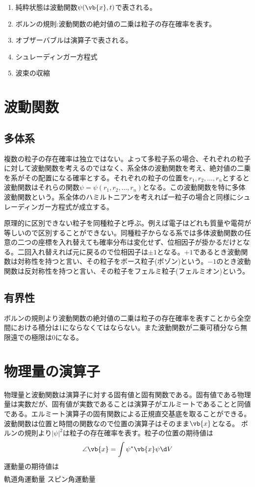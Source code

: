 	\begin{enumerate}
		\item 純粋状態は波動関数$\psi(\vb{x}, t)$で表される。
		\item ボルンの規則:波動関数の絶対値の二乗は粒子の存在確率を表す。
		\item オブザーバブルは演算子で表される。
		\item シュレーディンガー方程式
		\item 波束の収縮
	\end{enumerate}
\section{波動関数}
	\subsection{多体系}
		複数の粒子の存在確率は独立ではない。よって多粒子系の場合、それぞれの粒子に対して波動関数を考えるのではなく、系全体の波動関数を考え、絶対値の二乗を系がその配置になる確率とする。それぞれの粒子の位置を$r_1, r_2, \ldots, r_n$とすると波動関数はそれらの関数$\psi = \psi(r_1, r_2, \ldots, r_n)$となる。この波動関数を特に多体波動関数という。系全体のハミルトニアンを考えれば一粒子の場合と同様にシュレーディンガー方程式が成立する。

		原理的に区別できない粒子を同種粒子と呼ぶ。例えば電子はどれも質量や電荷が等しいので区別することができない。同種粒子からなる系では多体波動関数の任意の二つの座標を入れ替えても確率分布は変化せず、位相因子が掛かるだけとなる。二回入れ替えれば元に戻るので位相因子は$\pm 1$となる。$+1$であるとき波動関数は対称性を持つと言い、その粒子をボース粒子(ボゾン)という。$-1$のとき波動関数は反対称性を持つと言い、その粒子をフェルミ粒子(フェルミオン)という。
	\subsection{有界性}
		ボルンの規則より波動関数の絶対値の二乗は粒子の存在確率を表すことから全空間における積分は1にならなくてはならない。また波動関数が二乗可積分なら無限遠での極限は0になる。

\section{物理量の演算子}
	物理量と波動関数は演算子に対する固有値と固有関数である。固有値である物理量は実数だが、固有値が実数であることは演算子がエルミートであることと同値である。エルミート演算子の固有関数による正規直交基底を取ることができる。
	波動関数は位置と時間の関数なので位置の演算子はそのまま$\vb{x}$となる。
	ボルンの規則より$|\psi|^2$は粒子の存在確率を表す。粒子の位置の期待値は
		\[\angle{\vb{x}} = \int \psi^* \vb{x} \psi \d V\]
	運動量の期待値は
	\begin{align*}
	\end{align*}
	軌道角運動量
	スピン角運動量
